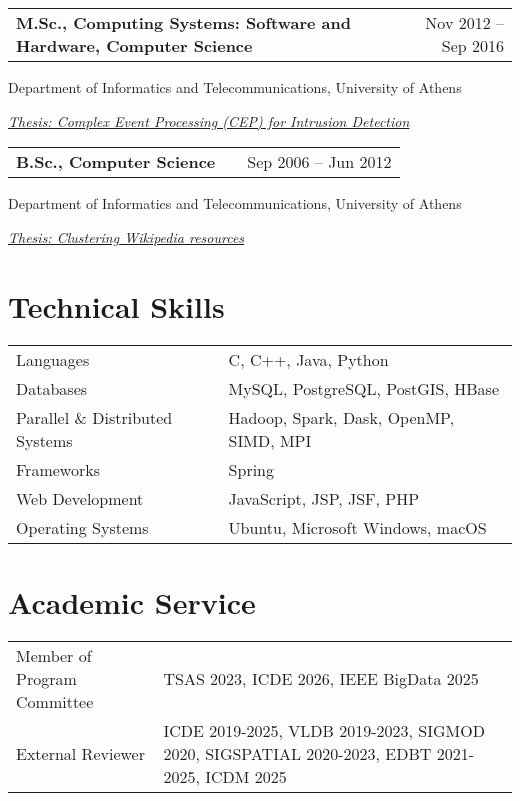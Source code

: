 \documentclass[a4paper,12pt]{article}
\makeatletter
\newenvironment{job}[2]
{
	\begin{tabularx}{\linewidth}{@{}l X r@{}}
		\small
		\textbf{#1} & \hfill &  #2 \\[3.75pt]
	\end{tabularx}
	\begin{minipage}[t]{\linewidth}
		\footnotesize
		\setlength{\parskip}{3pt} %
		\setlength{\parindent}{0pt} %
	}
	{
	\end{minipage}    
}
\makeatother
\begin{document}
\vspace{-0.2\baselineskip}

\begin{job}{M.Sc., Computing Systems: Software and Hardware, Computer Science}{Nov 2012 – Sep 2016}
Department of Informatics and Telecommunications, University of Athens

\underline{\textit{Thesis: Complex Event Processing (CEP) for Intrusion Detection}}	
\end{job}

\vspace{-0.2\baselineskip}

\begin{job}{B.Sc., Computer Science}{Sep 2006 – Jun 2012}
Department of Informatics and Telecommunications, University of Athens

\underline{\textit{Thesis: Clustering Wikipedia resources}}
\end{job}



\section{Technical Skills}
\begin{tabularx}{\linewidth}{@{}l X@{}}
	Languages &  \normalsize{C, C++, Java, Python
	}\\
	Databases  &  \normalsize{MySQL, PostgreSQL, PostGIS, HBase}\\ 
	Parallel \& Distributed Systems &  \normalsize{Hadoop, Spark, Dask, OpenMP, SIMD, MPI}\\
	Frameworks  &  \normalsize{Spring}\\ 
	Web Development &  \normalsize{JavaScript, JSP, JSF, PHP
	}\\
	Operating Systems &  \normalsize{Ubuntu, Microsoft Windows, macOS
	}\\  
\end{tabularx}


\section{Academic Service}
\begin{tabularx}{\linewidth}{@{}l X@{}}
	Member of Program Committee
	 &  \normalsize{TSAS 2023, ICDE 2026, IEEE BigData 2025
	}\\
	
	
	External Reviewer
	  &  \normalsize{ICDE 2019-2025, VLDB 2019-2023, SIGMOD 2020, SIGSPATIAL 2020-2023, EDBT 2021-2025, ICDM 2025
	  }\\ 
\end{tabularx}
\end{document}
